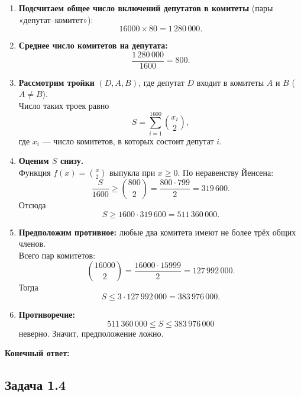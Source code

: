 \documentclass[12pt]{article}
\begin{document}
\begin{enumerate}[label=\textbf{\arabic*.}]
    \item \textbf{Подсчитаем общее число включений депутатов в комитеты} (пары «депутат–комитет»):
    \[
    16000 \times 80 = 1\,280\,000.
    \]

    \item \textbf{Среднее число комитетов на депутата:}
    \[
    \frac{1\,280\,000}{1600} = 800.
    \]

    \item \textbf{Рассмотрим тройки} $(D, A, B)$, где депутат $D$ входит в комитеты $A$ и $B$ ($A \neq B$). \\
    Число таких троек равно
    \[
    S = \sum_{i=1}^{1600} \binom{x_i}{2},
    \]
    где $x_i$ — число комитетов, в которых состоит депутат $i$.

    \item \textbf{Оценим $S$ снизу.} \\
    Функция $f(x) = \binom{x}{2}$ выпукла при $x \ge 0$. По неравенству Йенсена:
    \[
    \frac{S}{1600} \ge \binom{800}{2} = \frac{800 \cdot 799}{2} = 319\,600.
    \]
    Отсюда
    \[
    S \ge 1600 \cdot 319\,600 = 511\,360\,000.
    \]

    \item \textbf{Предположим противное:} любые два комитета имеют не более трёх общих членов. \\
    Всего пар комитетов:
    \[
    \binom{16000}{2} = \frac{16000 \cdot 15999}{2} = 127\,992\,000.
    \]
    Тогда
    \[
    S \le 3 \cdot 127\,992\,000 = 383\,976\,000.
    \]

    \item \textbf{Противоречие:}
    \[
    511\,360\,000 \le S \le 383\,976\,000
    \]
    неверно. Значит, предположение ложно.
\end{enumerate}

\vspace{0.5cm}
\noindent
\textbf{Конечный ответ:} \\

\subsection*{Задача 1.4}
\end{document}
